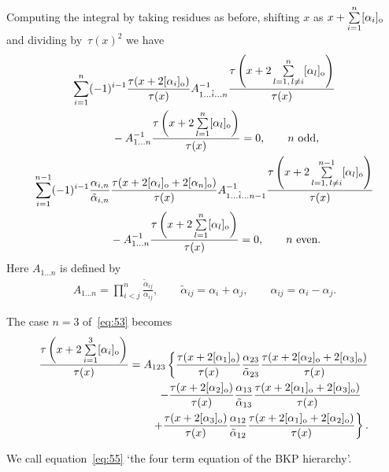 \documentclass[pdftex]{sigma}
\begin{document}
Computing the integral by taking residues as before, shifting $x$ as $x+\sum\limits_{i=1}^{n}[\alpha_i]_{\rm o}$ and
divi\-ding by~$\tau(x)^2$ we have
\begin{gather}
\sum_{i=1}^{n}(-1)^{i-1}\frac{\tau(x+2[\alpha_i]_{\rm o})}{\tau(x)}A_{1\dots\hat{i}\dots n}^{-1}
\frac{\tau\left(x+2\sum\limits_{l=1,\, l\neq i}^n[\alpha_l]_{\rm o}\right)}{\tau(x)}\nonumber
\\
\qquad
{}-A_{1\dots n}^{-1}\frac{\tau\left(x+2\sum\limits_{l=1}^{n}[\alpha_l]_{\rm o}\right)}{\tau(x)}=0,\qquad  n \ \text{odd},
\label{eq:53}
\\
\sum_{i=1}^{n-1}(-1)^{i-1}\frac{\alpha_{i,n}}{\tilde{\alpha}_{i,n}}
\frac{\tau(x+2[\alpha_i]_{\rm o}+2[\alpha_n]_{\rm o})}{\tau(x)}A_{1\dots\hat{i}\dots n-1}^{-1}
\frac{\tau\left(x+2\sum\limits_{l=1,\, l\neq i}^{n-1}[\alpha_l]_{\rm o}\right)}{\tau(x)}\nonumber
\\
\qquad
{} -A_{1\dots n}^{-1}\frac{\tau\left(x+2\sum\limits_{l=1}^{n}[\alpha_l]_{\rm o}\right)}{\tau(x)}=0,\qquad  n \ \text{even}.
\label{eq:54}
\end{gather}
Here $A_{1\dots n}$ is def\/ined by
\begin{gather*}
A_{1\dots n}=\prod_{i<j}^{n}\frac{\tilde{\alpha}_{ij}}{\alpha_{ij}},\qquad \tilde{\alpha}_{ij}
=\alpha_i+\alpha_j,\qquad \alpha_{ij}=\alpha_i-\alpha_j.
\end{gather*}
\begin{example}\label{example3}
The case $n=3$ of~\eqref{eq:53} becomes
\begin{gather}
\frac{\tau\left(x+2\sum\limits_{i=1}^{3}[\alpha_i]_{\rm o}\right)}{\tau(x)}=A_{123}\left\{\frac{\tau(x+2[\alpha_1]_{\rm o})}{\tau(x)}
\frac{\alpha_{23}}{\tilde{\alpha}_{23}}\frac{\tau(x+2[\alpha_2]_{\rm o}+2[\alpha_3]_{\rm o})}{\tau(x)}\right.
\nonumber
\\
\hskip36mm-\frac{\tau(x+2[\alpha_2]_{\rm o})}{\tau(x)}\frac{\alpha_{13}}{\tilde{\alpha}_{13}}
\frac{\tau(x+2[\alpha_1]_{\rm o}+2[\alpha_3]_{\rm o})}{\tau(x)}\nonumber
\\
\hskip36mm\left.
+\frac{\tau(x+2[\alpha_3]_{\rm o})}{\tau(x)}\frac{\alpha_{12}}{\tilde{\alpha}_{12}}
\frac{\tau(x+2[\alpha_1]_{\rm o}+2[\alpha_2]_{\rm o})}{\tau(x)}\right\}.
\label{eq:55}
\end{gather}
\end{example}
We call equation~\eqref{eq:55} `the four term equation of the BKP hierarchy'.
\end{document}
